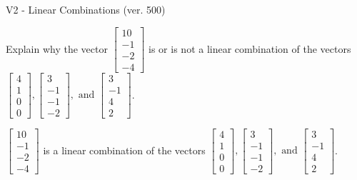 \begin{exercise}
  \begin{exerciseTitle}V2 - Linear Combinations (ver. 500)\end{exerciseTitle}
  \begin{exerciseStatement}
    Explain why the vector \(\left[\begin{array}{c}
10 \\
-1 \\
-2 \\
-4
\end{array}\right]\)  is or is not a linear 
	combination of the vectors \(\left[\begin{array}{c}
4 \\
1 \\
0 \\
0
\end{array}\right] , \left[\begin{array}{c}
3 \\
-1 \\
-1 \\
-2
\end{array}\right] , \text{ and } \left[\begin{array}{c}
3 \\
-1 \\
4 \\
2
\end{array}\right]\).
	


  \end{exerciseStatement}
  \begin{exerciseAnswer}
   \(\left[\begin{array}{c}
10 \\
-1 \\
-2 \\
-4
\end{array}\right]\) 
  	 is  
	a linear combination of the vectors \(\left[\begin{array}{c}
4 \\
1 \\
0 \\
0
\end{array}\right] , \left[\begin{array}{c}
3 \\
-1 \\
-1 \\
-2
\end{array}\right] , \text{ and } \left[\begin{array}{c}
3 \\
-1 \\
4 \\
2
\end{array}\right]\).

	
  


  \end{exerciseAnswer}
\end{exercise}